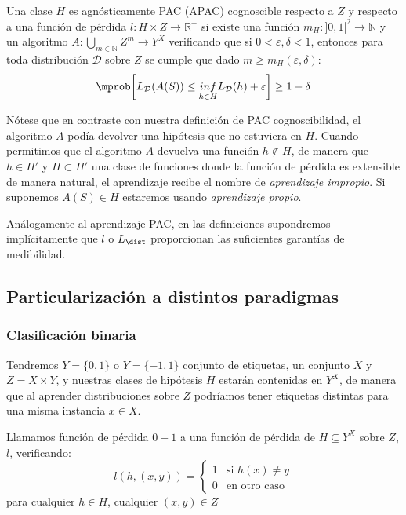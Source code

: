 \begin{definition}
Una clase $H$ es agnósticamente PAC (APAC) cognoscible respecto a $Z$ y respecto a una función de pérdida 
$l: H \times Z \rightarrow \mathbb{R}^{+}$ si existe una función 
$m_{H} : ]0,1[^2\rightarrow \mathbb{N}$ y un algoritmo 
$A: \underset{m\in \mathbb{N}}{\bigcup} Z^m \rightarrow Y^X$ verificando que si 
$0 < \varepsilon, \delta < 1$, entonces para toda distribución $\mathcal{D}$ sobre $Z$
se cumple que dado $m\ge m_{H}(\varepsilon, \delta)$:
\[\mprob \bigg[L_{\mathcal{D}}(A(S)) \le \underset{h\in H}{inf} L_{\mathcal{D}}(h) + \varepsilon \bigg] \ge 1-\delta\]
\end{definition}

Nótese que en contraste con nuestra definición de PAC cognoscibilidad, el algoritmo $A$ podía devolver una 
hipótesis que no estuviera en $H$. Cuando permitimos que el algoritmo $A$ devuelva una función 
$h \notin H$, de manera que $h \in H'$ y  $H \subset H'$ una clase de funciones donde la función de pérdida 
es extensible de manera natural, el aprendizaje recibe el nombre de \textit{aprendizaje impropio}. Si suponemos
$A(S) \in H$ estaremos usando \textit{aprendizaje propio}.

Análogamente al aprendizaje PAC, en las definiciones supondremos implícitamente que $l$ o $L_{\dist}$ proporcionan las suficientes
garantías de medibilidad.

\subsection{Particularización a distintos paradigmas}

\subsubsection{Clasificación binaria}
\label{sec:clas-binaria}

Tendremos $Y=\{0,1\}$ o $Y=\{-1,1\}$ conjunto de etiquetas, un conjunto $X$ y $Z=X\times Y$, y nuestras clases
de hipótesis $H$ estarán contenidas en $Y^X$, de manera que al aprender distribuciones sobre $Z$ podríamos 
tener etiquetas distintas para una misma instancia $x \in X$.

\begin{definition}
Llamamos función de pérdida $0-1$ a una función de pérdida de $H\subseteq Y^X$ sobre $Z$, $l$, verificando:
\[
  l(h, (x,y)) = \left\{\begin{array}{ll}
                        1 & \textrm{si } h(x)\neq y\\
                        0 & \textrm{en otro caso}
                        \end{array}\right.
\]
para cualquier $h\in H$, cualquier $(x,y) \in Z$
\label{def:zero-one-loss}
\end{definition}

